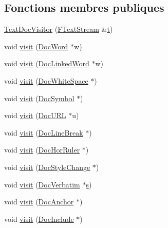 \subsection*{Fonctions membres publiques}
\begin{DoxyCompactItemize}
\item 
\hyperlink{class_text_doc_visitor_a77d28305d982c5681991b6f3ff6b5d65}{Text\+Doc\+Visitor} (\hyperlink{class_f_text_stream}{F\+Text\+Stream} \&\hyperlink{058__bracket__recursion_8tcl_a69e959f6901827e4d8271aeaa5fba0fc}{t})
\item 
void \hyperlink{class_text_doc_visitor_af86cde546660f679adb11ae28c87e578}{visit} (\hyperlink{class_doc_word}{Doc\+Word} $\ast$w)
\item 
void \hyperlink{class_text_doc_visitor_ab41aa1a600f2330ff881d69521452342}{visit} (\hyperlink{class_doc_linked_word}{Doc\+Linked\+Word} $\ast$w)
\item 
void \hyperlink{class_text_doc_visitor_ae626ad5026555afa04fb74f4859ac713}{visit} (\hyperlink{class_doc_white_space}{Doc\+White\+Space} $\ast$)
\item 
void \hyperlink{class_text_doc_visitor_a0bc0fdd49e5a6f38fff8ac61391a05d4}{visit} (\hyperlink{class_doc_symbol}{Doc\+Symbol} $\ast$)
\item 
void \hyperlink{class_text_doc_visitor_a126c76c9a168b4dc8cdbbb0d9efa04c2}{visit} (\hyperlink{class_doc_u_r_l}{Doc\+U\+R\+L} $\ast$u)
\item 
void \hyperlink{class_text_doc_visitor_af373aa96f8973a6dbc152d481fe165da}{visit} (\hyperlink{class_doc_line_break}{Doc\+Line\+Break} $\ast$)
\item 
void \hyperlink{class_text_doc_visitor_ae228be476797301445bf40999846f830}{visit} (\hyperlink{class_doc_hor_ruler}{Doc\+Hor\+Ruler} $\ast$)
\item 
void \hyperlink{class_text_doc_visitor_a68d80c24b48a1027277867d08e465fad}{visit} (\hyperlink{class_doc_style_change}{Doc\+Style\+Change} $\ast$)
\item 
void \hyperlink{class_text_doc_visitor_a9708b549ad13e49d2c4755702d12f2fd}{visit} (\hyperlink{class_doc_verbatim}{Doc\+Verbatim} $\ast$\hyperlink{060__command__switch_8tcl_a011c73f2dbb87635a3b4206c72355f6e}{s})
\item 
void \hyperlink{class_text_doc_visitor_ade406b13a057f8636fa9dca375dcbf25}{visit} (\hyperlink{class_doc_anchor}{Doc\+Anchor} $\ast$)
\item 
void \hyperlink{class_text_doc_visitor_a891afc1d755df0859197fabc6b2ce819}{visit} (\hyperlink{class_doc_include}{Doc\+Include} $\ast$)

\end{DoxyCompactItemize}
